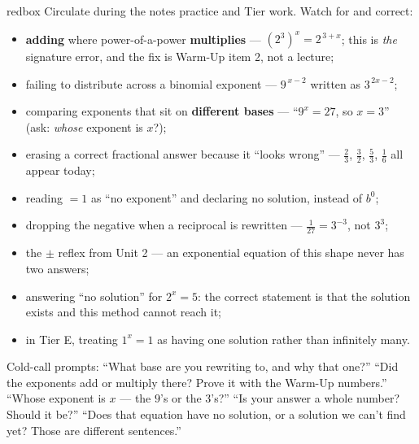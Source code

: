 \documentclass[10pt]{article}
\begin{document}
\begin{skillbox}{redbox}
Circulate during the notes practice and Tier work. Watch for and correct:
\begin{itemize}[leftmargin=1.2em, nosep]
  \item \textbf{adding} where power-of-a-power \textbf{multiplies} --- $\left(2^{3}\right)^{x}=2^{\,3+x}$; this is \emph{the} signature error, and the fix is Warm-Up item 2, not a lecture;
  \item failing to distribute across a binomial exponent --- $9^{\,x-2}$ written as $3^{\,2x-2}$;
  \item comparing exponents that sit on \textbf{different bases} --- ``$9^{x}=27$, so $x=3$'' (ask: \emph{whose} exponent is $x$?);
  \item erasing a correct fractional answer because it ``looks wrong'' --- $\frac23$, $\frac32$, $\frac53$, $\frac16$ all appear today;
  \item reading $=1$ as ``no exponent'' and declaring no solution, instead of $b^{0}$;
  \item dropping the negative when a reciprocal is rewritten --- $\frac{1}{27}=3^{-3}$, not $3^{3}$;
  \item the $\pm$ reflex from Unit 2 --- an exponential equation of this shape never has two answers;
  \item answering ``no solution'' for $2^{x}=5$: the correct statement is that the solution exists and this method cannot reach it;
  \item in Tier E, treating $1^{x}=1$ as having one solution rather than infinitely many.
\end{itemize}
Cold-call prompts: ``What base are you rewriting to, and why that one?'' ``Did the exponents add or
multiply there? Prove it with the Warm-Up numbers.'' ``Whose exponent is $x$ --- the $9$'s or the
$3$'s?'' ``Is your answer a whole number? Should it be?'' ``Does that equation have no solution, or a
solution we can't find yet? Those are different sentences.''
\end{skillbox}
\end{document}
